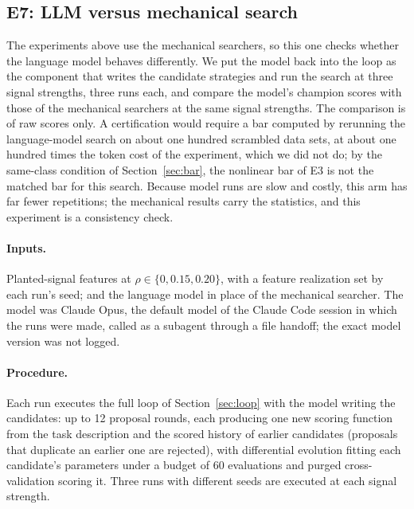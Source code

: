\documentclass[11pt]{article}
\begin{document}
\subsection{E7: LLM versus mechanical search}

The experiments above use the mechanical searchers, so
this one checks whether the language model behaves differently. We put the model back into the loop as
the component that writes the candidate strategies and run the search at three signal strengths, three
runs each, and compare the model's champion scores with those of the mechanical searchers at the same
signal strengths. The comparison is of raw scores only. A certification would require a bar computed by
rerunning the language-model search on about one hundred scrambled data sets, at about one hundred times
the token cost of the experiment, which we did not do; by the same-class condition of
Section~\ref{sec:bar}, the nonlinear bar of E3 is not the matched bar for this search. Because model
runs are slow and costly, this arm has far fewer repetitions; the mechanical results carry the
statistics, and this experiment is a consistency check.

\paragraph{Inputs.} Planted-signal features at $\rho \in \{0, 0.15, 0.20\}$, with a feature realization
set by each run's seed; and the language model in place of the mechanical searcher. The model was Claude
Opus, the default model of the Claude Code session in which the runs were made, called as a subagent
through a file handoff; the exact model version was not logged.

\paragraph{Procedure.} Each run executes the full loop of Section~\ref{sec:loop} with the model writing
the candidates: up to 12 proposal rounds, each producing one new scoring function from the task
description and the scored history of earlier candidates (proposals that duplicate an earlier one are
rejected), with differential evolution fitting each candidate's parameters under a budget of 60
evaluations and purged cross-validation scoring it. Three runs with different seeds are executed at each
signal strength.
\end{document}
